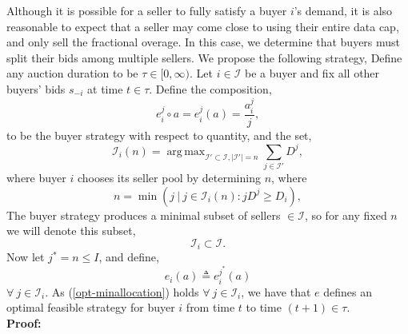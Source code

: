 \documentclass[12pt]{article}
\theoremstyle{definition}
\newcommand{\vs}{\varsigma}
\newcommand{\mcI}{\mathcal{I}}
\DeclareMathOperator*{\argmax}{arg\,max}
\DeclareMathOperator*{\argmin}{arg\,min}
\begin{document}
\begin{multicols}{2}
Although it is possible for a seller to fully satisfy a buyer $i$'s demand, it
is also reasonable to expect that a seller may come close to using their
entire data cap, and only sell the fractional overage. In this case, we
determine that buyers must split their bids among multiple sellers. 
We propose the following strategy, 
{
\label{buyerstrategy}
Define any auction duration to be $\tau \in [0,\infty)$. 
Let $i\in\mcI$ be a buyer and fix all other buyers' bids $s_{-i}$ at time
$t\in\tau$. %
Define the composition,
$$
     e_i^j \circ a = e_i^j(a) = \frac{a_i^j}{j},
$$
to be the buyer strategy with respect to quantity, and the set,
$$
    \mcI_i(n) =\argmax_{\mcI' \subset \mcI, \vert\mcI'\vert =
n}\sum_{j\in\mcI'} D^j,
$$
where buyer $i$ chooses its seller pool by determining $n$, where
\begin{equation}\label{buyercoordinate}
    n = \min( j\ \vert\ j\in \mcI_i(n): j D^j\ge D_i),
\end{equation} 
The buyer strategy produces a minimal subset of sellers $\in \mcI$, so for any
fixed $n$ we will denote this subset,
\begin{equation}\label{sellers}
    \mcI_i \subset \mcI.
\end{equation}  
Now let $j^* = n \le I$, and define,
\begin{equation}\label{opt-minallocation}
    e_i(a) \triangleq e_i^{j^*}(a)
\end{equation}
$\forall \ j \in \mcI_i$.
As (\ref{opt-minallocation}) holds $\forall \ j\in\mcI_i$,
we have that $e$ defines an optimal feasible strategy for buyer $i$ from time $t$ to time $(t+1) \in\tau$.
}\\
\textbf{Proof:}


\end{multicols}
\end{document}
